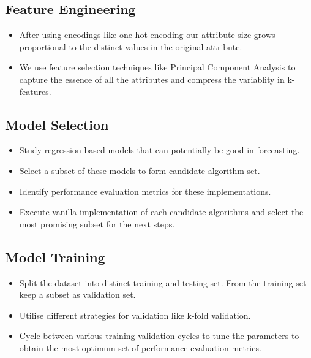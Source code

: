     \subsection{Feature Engineering}
        \begin{itemize}
            \item
                After using encodings like one-hot encoding our attribute size grows proportional to the distinct values in the original attribute.
            \item
                We use feature selection techniques like Principal Component Analysis to capture the essence of all the attributes and compress the variablity in k-features.
        \end{itemize}    
    
    \subsection{Model Selection}
        \begin{itemize}
            \item
                Study regression based models that can potentially be good in forecasting.
            \item
                Select a subset of these models to form candidate algorithm set.
            \item
                Identify performance evaluation metrics for these implementations.
            \item
                Execute vanilla implementation of each candidate algorithms and select the most promising subset for the next steps.
        \end{itemize}
    
    \subsection{Model Training}
        \begin{itemize}
            \item
                Split the dataset into distinct training and testing set. From the training set keep a subset as validation set.
            \item
                Utilise different strategies for validation like k-fold validation.
            \item
                Cycle between various training validation cycles to tune the parameters to obtain the most optimum set of performance evaluation metrics.
        \end{itemize}
    
